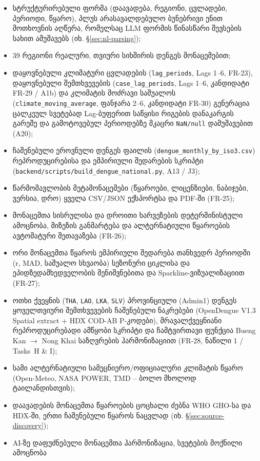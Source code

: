 \documentclass[11pt,a4paper]{article}
\begin{document}
\begin{itemize}[leftmargin=1.4em]
  \item სტრუქტურირებული ფორმა (დაავადება, რეგიონი, ცვლადები, პერიოდი,
    წყარო), პლუს არასავალდებულო ბუნებრივი ენით მოთხოვნის აღწერა,
    რომელსაც LLM ფორმის წინასწარი შევსების სახით ამუშავებს
    (იხ. \S\ref{sec:nl-parsing});
  \item 39 რეგიონი რეალური, თვიური სიხშირის დენგეს მონაცემებით;
  \item დაყოვნებული კლიმატური ცვლადების (\texttt{lag\_periods}, Lags 1--6, FR-23), დაყოვნებული შემთხვევების (\texttt{case\_lag\_periods}, Lags 1--6, კანდიდატი FR-29 / A1b) და კლიმატის მოძრავი საშუალოს (\texttt{climate\_moving\_average}, ფანჯარა 2--6, კანდიდატი FR-30) გენერაცია ცალკეულ სვეტებად Lag-ბუფერით საწყისი რიგების დანაკარგის გარეშე და გამოტოვებულ პერიოდებზე მკაცრი \texttt{NaN/null} დამუშავებით (A20);
  \item ჩაშენებული ეროვნული დენგეს ფაილის (\texttt{dengue\_monthly\_by\_iso3.csv}) რეპროდუცირებისა და ემპირიული შედარების სკრიპტი (\texttt{backend/scripts/build\_dengue\_national.py}, A13 / J3);
  \item წარმომავლობის მეტამონაცემები (წყაროები, ლიცენზიები, ნაბიჯები, ვერსია,
    დრო) ყველა CSV/JSON ექსპორტსა და PDF-ში (FR-25);
  \item მონაცემთა სისრულისა და დროითი ხარვეზების დეტერმინისტული ამოცნობა,
    მიზეზის განმარტება და ალტერნატიული წყაროების ავტომატური შეთავაზება (FR-26);
  \item ორი მონაცემთა წყაროს ემპირიული შედარება თანხვედრ პერიოდში (r, MAD, საშუალო სხვაობა)
    სეზონური ციკლისა და ეპიდზედამხედველობის შენიშვნებითა და Sparkline-ვიზუალიზაციით (FR-27);
  \item ოთხი ქვეყნის (\texttt{THA}, \texttt{LAO}, \texttt{LKA}, \texttt{SLV}) პროვინციული (Admin1) დენგეს ყოველთვიური შემთხვევების ჩაშენებული ნაკრებები (OpenDengue V1.3 Spatial extract + HDX COD-AB P-კოდები), მრავალქვეყნიანი რეპროდუცირებადი ამწყობი სკრიპტი და ჩამტვირთავი ფუნქცია Bueng Kan $\rightarrow$ Nong Khai საზღვრების ჰარმონიზაციით (FR-28, ნაწილი 1 / Tasks~H \& I);
  \item სამი ალტერნატიული სამეცნიერო/ოფიციალური კლიმატის წყარო
    (Open-Meteo, NASA POWER, TMD -- ბოლო მხოლოდ ტაილანდისთვის);
  \item დაავადების მონაცემთა წყაროების ცოცხალი ძებნა WHO GHO-სა და
    HDX-ში, ერთი ჩაშენებული წყაროს ნაცვლად (იხ. \S\ref{sec:source-discovery});
  \item AI-ზე დაფუძნებული მონაცემთა ჰარმონიზაცია, სვეტების მოქნილი ამოცნობა

\end{itemize}
\end{document}
